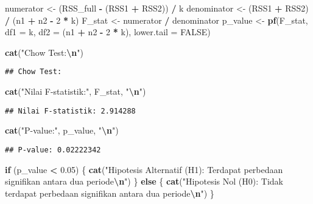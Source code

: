 \documentclass[
]{article}
\newenvironment{Shaded}{\begin{snugshade}}{\end{snugshade}}
\newcommand{\AttributeTok}[1]{\textcolor[rgb]{0.13,0.29,0.53}{#1}}
\newcommand{\ConstantTok}[1]{\textcolor[rgb]{0.56,0.35,0.01}{#1}}
\newcommand{\ControlFlowTok}[1]{\textcolor[rgb]{0.13,0.29,0.53}{\textbf{#1}}}
\newcommand{\DecValTok}[1]{\textcolor[rgb]{0.00,0.00,0.81}{#1}}
\newcommand{\FloatTok}[1]{\textcolor[rgb]{0.00,0.00,0.81}{#1}}
\newcommand{\FunctionTok}[1]{\textcolor[rgb]{0.13,0.29,0.53}{\textbf{#1}}}
\newcommand{\NormalTok}[1]{#1}
\newcommand{\OtherTok}[1]{\textcolor[rgb]{0.56,0.35,0.01}{#1}}
\newcommand{\SpecialCharTok}[1]{\textcolor[rgb]{0.81,0.36,0.00}{\textbf{#1}}}
\newcommand{\StringTok}[1]{\textcolor[rgb]{0.31,0.60,0.02}{#1}}
\begin{document}
\begin{Shaded}
\begin{Highlighting}[]
\NormalTok{numerator }\OtherTok{\textless{}{-}}\NormalTok{ (RSS\_full }\SpecialCharTok{{-}}\NormalTok{ (RSS1 }\SpecialCharTok{+}\NormalTok{ RSS2)) }\SpecialCharTok{/}\NormalTok{ k}
\NormalTok{denominator }\OtherTok{\textless{}{-}}\NormalTok{ (RSS1 }\SpecialCharTok{+}\NormalTok{ RSS2) }\SpecialCharTok{/}\NormalTok{ (n1 }\SpecialCharTok{+}\NormalTok{ n2 }\SpecialCharTok{{-}} \DecValTok{2} \SpecialCharTok{*}\NormalTok{ k)}
\NormalTok{F\_stat }\OtherTok{\textless{}{-}}\NormalTok{ numerator }\SpecialCharTok{/}\NormalTok{ denominator}
\NormalTok{p\_value }\OtherTok{\textless{}{-}} \FunctionTok{pf}\NormalTok{(F\_stat, }\AttributeTok{df1 =}\NormalTok{ k, }\AttributeTok{df2 =}\NormalTok{ (n1 }\SpecialCharTok{+}\NormalTok{ n2 }\SpecialCharTok{{-}} \DecValTok{2} \SpecialCharTok{*}\NormalTok{ k), }\AttributeTok{lower.tail =} \ConstantTok{FALSE}\NormalTok{)}

\FunctionTok{cat}\NormalTok{(}\StringTok{"Chow Test:}\SpecialCharTok{\textbackslash{}n}\StringTok{"}\NormalTok{)}
\end{Highlighting}
\end{Shaded}

\begin{verbatim}
## Chow Test:
\end{verbatim}

\begin{Shaded}
\begin{Highlighting}[]
\FunctionTok{cat}\NormalTok{(}\StringTok{"Nilai F{-}statistik:"}\NormalTok{, F\_stat, }\StringTok{"}\SpecialCharTok{\textbackslash{}n}\StringTok{"}\NormalTok{)}
\end{Highlighting}
\end{Shaded}

\begin{verbatim}
## Nilai F-statistik: 2.914288
\end{verbatim}

\begin{Shaded}
\begin{Highlighting}[]
\FunctionTok{cat}\NormalTok{(}\StringTok{"P{-}value:"}\NormalTok{, p\_value, }\StringTok{"}\SpecialCharTok{\textbackslash{}n}\StringTok{"}\NormalTok{)}
\end{Highlighting}
\end{Shaded}

\begin{verbatim}
## P-value: 0.02222342
\end{verbatim}

\begin{Shaded}
\begin{Highlighting}[]
\ControlFlowTok{if}\NormalTok{ (p\_value }\SpecialCharTok{\textless{}} \FloatTok{0.05}\NormalTok{) \{}
  \FunctionTok{cat}\NormalTok{(}\StringTok{"Hipotesis Alternatif (H1): Terdapat perbedaan signifikan antara dua periode}\SpecialCharTok{\textbackslash{}n}\StringTok{"}\NormalTok{)}
\NormalTok{\} }\ControlFlowTok{else}\NormalTok{ \{}
  \FunctionTok{cat}\NormalTok{(}\StringTok{"Hipotesis Nol (H0): Tidak terdapat perbedaan signifikan antara dua periode}\SpecialCharTok{\textbackslash{}n}\StringTok{"}\NormalTok{)}
\NormalTok{\}}
\end{Highlighting}
\end{Shaded}
\end{document}
